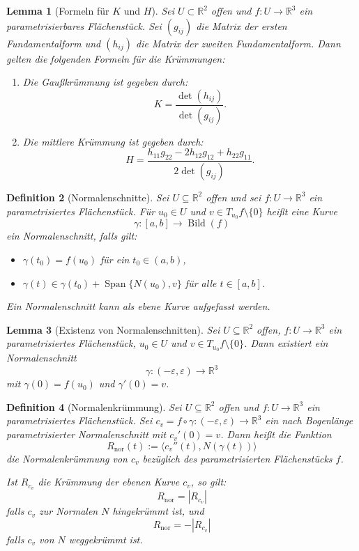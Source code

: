 \documentclass[a4paper,12pt]{article}
\theoremstyle{break}
\newtheorem{definition}{Definition}[section]
\newtheorem{lemma}[definition]{Lemma}
\begin{document}
\begin{lemma}[Formeln für $K$ und $H$]
Sei $U \subset \mathbb{R}^2$ offen und $f: U \to \mathbb{R}^3$ ein parametrisierbares Flächenstück. Sei $(g_{ij})$ die Matrix der ersten Fundamentalform und $(h_{ij})$ die Matrix der zweiten Fundamentalform. Dann gelten die folgenden Formeln für die Krümmungen:

\begin{enumerate}
    \item Die \emph{Gaußkrümmung} ist gegeben durch:
    \[
    K = \frac{\det (h_{ij})}{\det (g_{ij})}.
    \]
    \item Die \emph{mittlere Krümmung} ist gegeben durch:
    \[
    H = \frac{h_{11} g_{22} - 2 h_{12} g_{12} + h_{22} g_{11}}{2 \det(g_{ij})}.
    \]
\end{enumerate}
\end{lemma}

\begin{definition}[Normalenschnitte]
Sei \( U \subseteq \mathbb{R}^2 \) offen und sei \( f: U \to \mathbb{R}^3 \) ein parametrisiertes Flächenstück.  
Für \( u_0 \in U \) und \( v \in T_{u_0} f \setminus \{0\} \) heißt eine Kurve  
\[
\gamma: [a,b] \to \operatorname{Bild}(f)
\]
ein \emph{Normalenschnitt}, falls gilt:
\begin{itemize}
    \item \( \gamma(t_0) = f(u_0) \) für ein \( t_0 \in (a,b) \),
    \item \( \gamma(t) \in \gamma(t_0) + \operatorname{Span} \{N(u_0), v\} \) für alle \( t \in [a,b] \).
\end{itemize}
Ein Normalenschnitt kann als ebene Kurve aufgefasst werden.
\end{definition}

\begin{lemma}[Existenz von Normalenschnitten]
Sei \( U \subseteq \mathbb{R}^2 \) offen, \( f: U \to \mathbb{R}^3 \) ein parametrisiertes Flächenstück,  
\( u_0 \in U \) und \( v \in T_{u_0} f \setminus \{0\} \).  
Dann existiert ein Normalenschnitt  
\[
\gamma: (-\varepsilon, \varepsilon) \to \mathbb{R}^3
\]
mit \( \gamma(0) = f(u_0) \) und \( \gamma'(0) = v \).
\end{lemma}

\begin{definition}[Normalenkrümmung]
Sei \( U \subseteq \mathbb{R}^2 \) offen und \( f: U \to \mathbb{R}^3 \) ein parametrisiertes Flächenstück.  
Sei \( c_v = f \circ \gamma: (-\varepsilon, \varepsilon) \to \mathbb{R}^3 \) ein nach Bogenlänge parametrisierter Normalenschnitt mit \( c_v'(0) = v \).  
Dann heißt die Funktion  
\[
R_{\operatorname{nor}}(t) := \langle c_v''(t), N(\gamma(t)) \rangle
\]
die \emph{Normalenkrümmung} von \( c_v \) bezüglich des parametrisierten Flächenstücks \( f \).  

Ist \( R_{c_v} \) die Krümmung der ebenen Kurve \( c_v \), so gilt:  
\[
R_{\operatorname{nor}} = |R_{c_v}|
\]
falls \( c_v \) zur Normalen \( N \) hingekrümmt ist, und  
\[
R_{\operatorname{nor}} = -|R_{c_v}|
\]
falls \( c_v \) von \( N \) weggekrümmt ist.
\end{definition}
\end{document}
